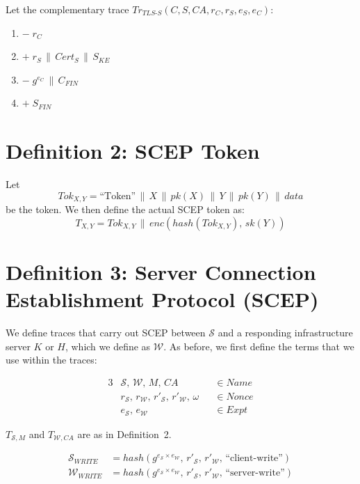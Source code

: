 \documentclass[12pt]{article}
\newcommand{\concat}{\,\|\,}
\newcommand{\enc}[2]{enc(#1,\,#2)}
\newcommand{\hash}[1]{hash(#1)}
\newcommand{\pk}[1]{\mathit{pk}(#1)}
\newcommand{\sk}[1]{\mathit{sk}(#1)}
\begin{document}
Let the complementary trace $\mathit{Tr}_{\mathit{TLS\text{-}S}}(C, S, CA, r_C, r_S, e_S, e_C)$:

\begin{enumerate}[label=\arabic*.,noitemsep]
  \item $-\; r_C$
  \item $+\; r_S \concat \mathit{Cert}_S \concat S_{KE}$
  \item $-\; g^{e_C} \concat C_{\mathit{FIN}}$
  \item $+\; S_{\mathit{FIN}}$
\end{enumerate}

\section{Definition 2: SCEP Token}
\label{def:token}

Let
\[
  \mathit{Tok}_{X,Y} = \text{``Token''} \concat X \concat \pk{X} \concat Y \concat \pk{Y} \concat \mathit{data}
\]
be the token. We then define the actual SCEP token as:
\[
  T_{X,Y} = \mathit{Tok}_{X,Y} \concat \enc{\hash{\mathit{Tok}_{X,Y}}}{\sk{Y}}
\]

\section{Definition 3: Server Connection Establishment Protocol (SCEP)}
\label{def:scep}

We define traces that carry out SCEP between $\mathcal{S}$ and a responding
infrastructure server $K$ or $H$, which we define as $\mathcal{W}$. As
before, we first define the terms that we use within the traces:

\begin{alignat*}{3}
  &\mathcal{S},\, \mathcal{W},\, M,\, CA &&\in \mathit{Name} \\
  &r_\mathcal{S},\, r_\mathcal{W},\, r'_\mathcal{S},\, r'_\mathcal{W},\, \omega
    &&\in \mathit{Nonce} \\
  &e_\mathcal{S},\, e_\mathcal{W} &&\in \mathit{Expt}
\end{alignat*}

$T_{\mathcal{S},M}$ and $T_{\mathcal{W},CA}$ are as in Definition~2.

\begin{align*}
  \mathcal{S}_{\mathit{WRITE}} &= \hash{g^{e_\mathcal{S} \times e_\mathcal{W}},\, r'_\mathcal{S},\, r'_\mathcal{W},\, \text{``client-write''}} \\
  \mathcal{W}_{\mathit{WRITE}} &= \hash{g^{e_\mathcal{S} \times e_\mathcal{W}},\, r'_\mathcal{S},\, r'_\mathcal{W},\, \text{``server-write''}}
\end{align*}
\end{document}
